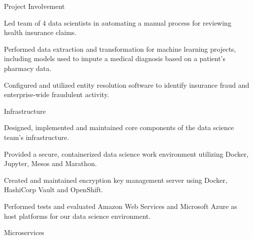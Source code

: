 \documentclass[]{deedy-resume-openfont}
\begin{document}
\vspace{\topsep} 
\begin{tightemize}
\item Project Involvement
    \vspace{\topsep}
    \begin{tightemize}
    \item Led team of 4 data scientists in automating a manual process for reviewing health insurance claims.
    \item Performed data extraction and transformation for machine learning projects, including models used to impute a medical diagnosis based on a patient's pharmacy data.
    \item Configured and utilized entity resolution software to identify insurance fraud and enterprise-wide fraudulent activity. 
    \end{tightemize}
    \vspace{\topsep}
\item Infrastructure
    \vspace{\topsep}
    \begin{tightemize}
    \item Designed, implemented and maintained core components of the data science team's infrastructure.
    \item Provided a secure, containerized data science work environment utilizing Docker, Jupyter, Mesos and Marathon.
    \item Created and maintained encryption key management server using Docker, HashiCorp Vault and OpenShift.
    \item Performed tests and evaluated Amazon Web Services and Microsoft Azure as host platforms for our data science environment. %
    \end{tightemize}
    \vspace{\topsep}
\item Microservices

\end{tightemize}
\end{document}
